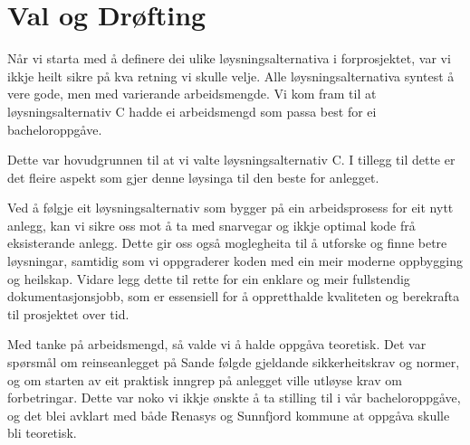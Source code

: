 \section{Val og Drøfting}

Når vi starta med å definere dei ulike løysningsalternativa i forprosjektet, var vi
ikkje heilt sikre på kva retning vi skulle velje. Alle løysningsalternativa syntest å vere gode,
men med varierande arbeidsmengde. Vi kom fram til at løysningsalternativ C hadde ei arbeidsmengd
som passa best for ei bacheloroppgåve.

Dette var hovudgrunnen til at vi valte løysningsalternativ C.
I tillegg til dette er det fleire aspekt som gjer denne løysinga til den beste for anlegget.

Ved å følgje eit løysningsalternativ som bygger på ein arbeidsprosess for eit nytt anlegg, 
kan vi sikre oss mot å ta med snarvegar og ikkje optimal kode frå eksisterande anlegg. 
Dette gir oss også moglegheita til å utforske og finne betre løysningar, 
samtidig som vi oppgraderer koden med ein meir moderne oppbygging og heilskap.
Vidare legg dette til rette for ein enklare og meir fullstendig dokumentasjonsjobb, 
som er essensiell for å oppretthalde kvaliteten og berekrafta til prosjektet over tid.

Med tanke på arbeidsmengd, så valde vi å halde oppgåva teoretisk.
Det var spørsmål om reinseanlegget på Sande følgde gjeldande sikkerheitskrav og normer,
og om starten av eit praktisk inngrep på anlegget ville utløyse krav om forbetringar.
Dette var noko vi ikkje ønskte å ta stilling til i vår bacheloroppgåve, og det blei avklart
med både Renasys og Sunnfjord kommune at oppgåva skulle bli teoretisk.

